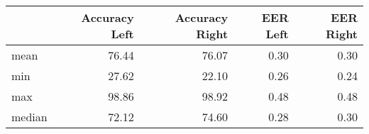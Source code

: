 \begin{tabular}{lrrrr}
\toprule
{} &  Accuracy Left &  Accuracy Right &  EER Left &  EER Right \\
\midrule
mean   &          76.44 &           76.07 &      0.30 &       0.30 \\
min    &          27.62 &           22.10 &      0.26 &       0.24 \\
max    &          98.86 &           98.92 &      0.48 &       0.48 \\
median &          72.12 &           74.60 &      0.28 &       0.30 \\
\bottomrule
\end{tabular}
